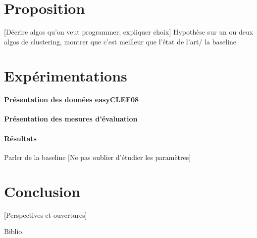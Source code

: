 \documentclass{article}
\begin{document}
\section{Proposition}
[Décrire algos qu'on veut programmer, expliquer choix]
Hypothèse sur un ou deux algos de clustering, montrer que c'est meilleur que l'état de l'art/ la baseline

\section{Expérimentations}
\paragraph{Présentation des données easyCLEF08}

\paragraph{Présentation des mesures d'évaluation}

\paragraph{Résultats}
Parler de la baseline
[Ne pas oublier d'étudier les paramètres]

\section{Conclusion}
[Perspectives et ouvertures]

Biblio
\end{document}
